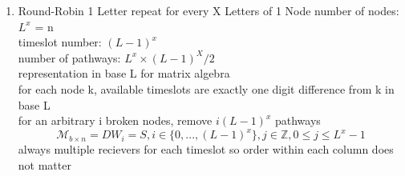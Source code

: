 \documentclass{article}
\begin{document}
\begin{enumerate}
\[\begin{bmatrix}
                    0 & 0 & 0 & 1 & 0 & 0 \\
                    0 & 0 & 0 & 0 & 1 & 0 \\
                \end{bmatrix}
            \]
            \[
                V =
                \begin{bmatrix}
                    0 & 0 & 0 & 0 & 0 & 1 \\
                    1 & 0 & 0 & 0 & 0 & 0 \\
                    0 & 1 & 0 & 1 & 0 & 0 \\
                    0 & 0 & 1 & 1 & 0 & 0 \\
                    1 & 0 & 0 & 1 & 0 & 0 \\
                    0 & 0 & 0 & 0 & 1 & 0 \\
                \end{bmatrix}
            \]
            \[
                W_{5 \times 5}= \mathscr{M}\mid W_{A_{i,k},i}= 1, \neg(W_{A_{i,k},i}
                ) = 0
            \]
            \[
                DT^{i}(V_{6 \times 6}) = DW_{6 \times 6}= D
                \begin{bmatrix}
                    0 & 0 & 0 & 0 & 1 & 0 \\
                    0 & 0 & 0 & 0 & 0 & 1 \\
                    1 & 0 & 1 & 0 & 0 & 0 \\
                    0 & 1 & 1 & 0 & 0 & 0 \\
                    0 & 0 & 1 & 0 & 0 & 1 \\
                    0 & 0 & 0 & 1 & 0 & 0 \\
                \end{bmatrix}
                = S , i \in \{1, ... ,5\}
            \]
            minimum time coefficient: 6
            maximum time coefficient: 30
            number of pathways: 15

        \item Round-Robin 1 Letter repeat for every X Letters of 1 Node
            number of nodes: $L^{x}$ = n \\
            timeslot number: $(L-1)^{x}$ \\
            number of pathways: $L^{x} \times (L-1)^{X}/2$\\
            representation in base L for matrix algebra\\
            for each node k, available timeslots are exactly one digit
            difference from k in base L\\
            for an arbitrary i broken nodes, remove $i(L-1)^{x}$ pathways
            \[
                \mathscr{M}_{b \times n}= DW_{i}= S, i \in \{0, ... ,(L-1)^{x}\},
                j \in \mathbb{Z}, 0\leq j \leq L^{x}-1
            \]
            always multiple recievers for each timeslot so order within each
            column does not matter


\end{enumerate}
\end{document}
